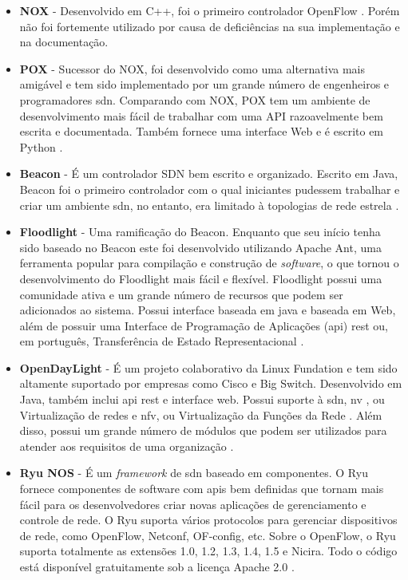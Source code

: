 \begin{itemize}
    \item \textbf{NOX} - Desenvolvido em C++, foi o primeiro controlador OpenFlow \cite{Gude:2008}. Porém não foi fortemente utilizado por causa de deficiências na sua implementação e na documentação.
    \item \textbf{POX} - Sucessor do NOX, foi desenvolvido como uma alternativa mais amigável e tem sido implementado por um grande número de engenheiros e programadores \gls{sdn}. Comparando com NOX, POX tem um ambiente de desenvolvimento mais fácil de trabalhar com uma API razoavelmente bem escrita e documentada. Também fornece uma interface Web e é escrito em Python \cite{website:pox}.
    \item \textbf{Beacon} - É um controlador SDN bem escrito e organizado. Escrito em Java, Beacon foi o primeiro controlador com o qual iniciantes pudessem trabalhar e criar um ambiente \gls{sdn}, no entanto, era limitado à topologias de rede estrela \cite{Erickson:2013}.
    \item \textbf{Floodlight} - Uma ramificação do Beacon. Enquanto que seu início tenha sido baseado no Beacon este foi desenvolvido utilizando Apache Ant, uma ferramenta popular para compilação e construção de \textit{software}, o que tornou o desenvolvimento do Floodlight mais fácil e flexível. Floodlight possui uma comunidade ativa e um grande número de recursos que podem ser adicionados ao sistema. Possui interface baseada em java e baseada em Web, além de possuir uma Interface de Programação de Aplicações (\gls{api}) \gls{rest} ou, em português, Transferência de Estado Representacional \cite{website:floodlight}.
    \item \textbf{OpenDayLight} - É um projeto colaborativo da Linux Fundation e tem sido altamente suportado por empresas como Cisco e Big Switch. Desenvolvido em Java, também inclui \gls{api} \gls{rest} e interface web. Possui suporte à \gls{sdn}, \gls{nv} , ou Virtualização de redes \cite{Chowdhury:2009} e \gls{nfv}, ou Virtualização da Funções da Rede \cite{Hawilo:2014}. Além disso, possui um grande número de módulos que podem ser utilizados para atender aos requisitos de uma organização \cite{website:odl}.
    \item \textbf{Ryu NOS} - É um \textit{framework} de \gls{sdn} baseado em componentes. O Ryu fornece componentes de software com \glspl{api} bem definidas que tornam mais fácil para os desenvolvedores criar novas aplicações de gerenciamento e controle de rede. O Ryu suporta vários protocolos para gerenciar dispositivos de rede, como OpenFlow, Netconf, OF-config, etc. Sobre o OpenFlow, o Ryu suporta totalmente as extensões 1.0, 1.2, 1.3, 1.4, 1.5 e Nicira. Todo o código está disponível gratuitamente sob a licença Apache 2.0 \cite{website:ryu}.
\end{itemize}

